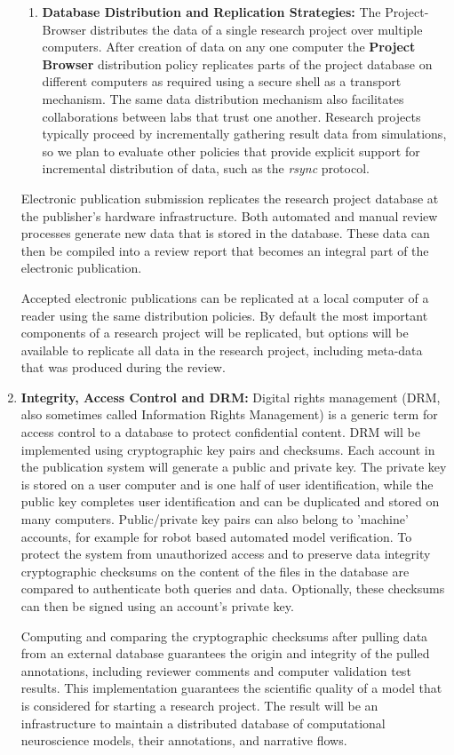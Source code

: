 \documentclass[12pt]{article}
\begin{document}
\begin{enumerate}
\begin{enumerate}
\item {\bf Database Distribution and Replication Strategies:} The Project-Browser distributes the data of a single research project over multiple computers. After creation of data on any one computer the {\bf Project\,Browser} distribution policy replicates parts of the project database on different computers as required using a secure shell as a transport mechanism. The same data distribution mechanism also facilitates collaborations between labs that trust one another.  Research projects typically proceed by incrementally gathering result data from simulations, so we plan to evaluate other policies that provide explicit support for incremental distribution of data, such as the {\it rsync} protocol.
\end{enumerate}
Electronic publication submission replicates the research project database at the publisher's hardware infrastructure. Both automated and manual review processes generate new data that is stored in the database. These data can then be compiled into a review report that becomes an integral part of the electronic publication.

Accepted electronic publications can be replicated at a local computer of a reader using the same distribution policies. By default the most important components of a research project will be replicated, but options will be available to replicate all data in the research project, including meta-data that was produced during the review.
\item {\bf Integrity, Access Control and DRM:} Digital rights management (DRM, also sometimes called Information Rights Management) is a generic term for access control to a database to protect confidential content. DRM will be implemented using cryptographic key pairs and checksums.  Each account in the publication system will generate a public and private key. The private key is stored on a user computer and is one half of user identification, while the public key completes user identification and can be duplicated and stored on many computers.  Public/private key pairs can also belong to 'machine' accounts, for example for robot based automated model verification. To protect the system from unauthorized access and to preserve data integrity cryptographic checksums on the content of the files in the database are compared to authenticate both queries and data. Optionally, these checksums can then be signed using an account's private key. 

Computing and comparing the cryptographic checksums after pulling data from an external database guarantees the origin and integrity of the pulled annotations, including reviewer comments and computer validation test results. This implementation guarantees the scientific quality of  a model that is considered for starting a research project. The result will be an infrastructure to maintain a distributed database of computational neuroscience models, their annotations, and narrative flows.


\end{enumerate}
\end{document}
